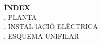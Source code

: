 \noindent \textbf{ÍNDEX} \\
\newline {}. PLANTA\\
\newline {}. INSTAL  lACIÓ ELÈCTRICA\\
\newline {}. ESQUEMA UNIFILAR\\



\clearpage
